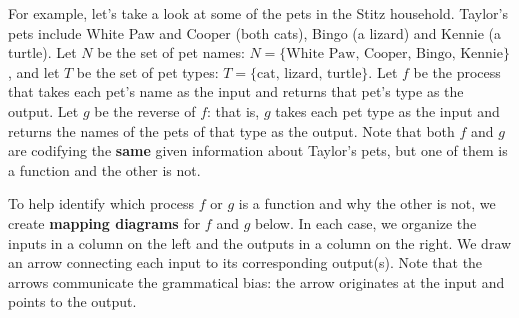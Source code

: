 \documentclass{ximera}
\begin{document}
For example, let's take a look at some of the pets in the Stitz household.  Taylor's pets include White Paw and Cooper (both cats), Bingo (a lizard) and Kennie (a turtle).  Let $N$ be the set of pet names: $N = \{ \text{White Paw, Cooper, Bingo, Kennie} \}$, and let $T$ be the set of pet types:  $T = \{ \text{cat, lizard, turtle} \}$.   Let $f$ be the process that takes each pet's name as the input and returns that pet's type as the output. Let $g$ be the reverse of $f$:  that is, $g$ takes each pet type as the input and returns the names of the pets of that type as the output.   Note that both $f$ and $g$ are codifying the \textbf{same} given information about Taylor's pets,  but one of them is a function and the other is not.  

To help identify which process $f$ or $g$ is a function and  why the other is not, we create   \textbf{mapping diagrams} for $f$ and $g$ below.  In each case, we organize the inputs in a column on the left and the outputs in a column on the right.  We draw an arrow connecting each input to its corresponding output(s).  Note that the arrows communicate the grammatical bias: the arrow originates at the input and points to the output.


\begin{image}

\end{image}
\begin{center}
\end{center}
\end{document}
